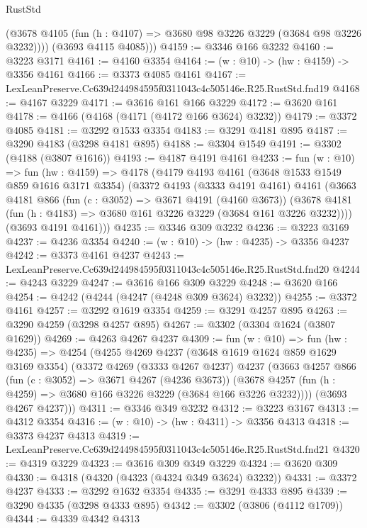\begin{lexlean}{RustStd}
\begin{coremodule}
          (@3678 @4105 (fun (h : @4107) => @3680 @98 @3226 @3229 (@3684 @98 @3226 @3232))))
        (@3693 @4115 @4085)))
@4159 := @3346 @166 @3232
@4160 := @3223 @3171
@4161 := @4160 @3354
@4164 := (w : @10) -> (hw : @4159) -> @3356 @4161
@4166 := @3373 @4085 @4161
@4167 := LexLeanPreserve.Cc639d244984595f0311043c4c505146e.R25.RustStd.fnd19
@4168 := @4167 @3229
@4171 := @3616 @161 @166 @3229
@4172 := @3620 @161
@4178 := @4166 (@4168 (@4171 (@4172 @166 @3624) @3232))
@4179 := @3372 @4085
@4181 := @3292 @1533 @3354
@4183 := @3291 @4181 @895
@4187 := @3290 @4183 (@3298 @4181 @895)
@4188 := @3304 @1549
@4191 := @3302 (@4188 (@3807 @1616))
@4193 := @4187 @4191 @4161
@4233 := fun (w : @10) =>
  fun (hw : @4159) =>
  @4178
    (@4179
      @4193
      @4161
      (@3648 @1533 @1549 @859 @1616 @3171 @3354)
      (@3372
        @4193
        (@3333 @4191 @4161)
        @4161
        (@3663
          @4181
          @866
          (fun (c : @3052) => @3671 @4191 (@4160 @3673))
          (@3678 @4181 (fun (h : @4183) => @3680 @161 @3226 @3229 (@3684 @161 @3226 @3232))))
        (@3693 @4191 @4161)))
@4235 := @3346 @309 @3232
@4236 := @3223 @3169
@4237 := @4236 @3354
@4240 := (w : @10) -> (hw : @4235) -> @3356 @4237
@4242 := @3373 @4161 @4237
@4243 := LexLeanPreserve.Cc639d244984595f0311043c4c505146e.R25.RustStd.fnd20
@4244 := @4243 @3229
@4247 := @3616 @166 @309 @3229
@4248 := @3620 @166
@4254 := @4242 (@4244 (@4247 (@4248 @309 @3624) @3232))
@4255 := @3372 @4161
@4257 := @3292 @1619 @3354
@4259 := @3291 @4257 @895
@4263 := @3290 @4259 (@3298 @4257 @895)
@4267 := @3302 (@3304 @1624 (@3807 @1629))
@4269 := @4263 @4267 @4237
@4309 := fun (w : @10) =>
  fun (hw : @4235) =>
  @4254
    (@4255
      @4269
      @4237
      (@3648 @1619 @1624 @859 @1629 @3169 @3354)
      (@3372
        @4269
        (@3333 @4267 @4237)
        @4237
        (@3663
          @4257
          @866
          (fun (c : @3052) => @3671 @4267 (@4236 @3673))
          (@3678 @4257 (fun (h : @4259) => @3680 @166 @3226 @3229 (@3684 @166 @3226 @3232))))
        (@3693 @4267 @4237)))
@4311 := @3346 @349 @3232
@4312 := @3223 @3167
@4313 := @4312 @3354
@4316 := (w : @10) -> (hw : @4311) -> @3356 @4313
@4318 := @3373 @4237 @4313
@4319 := LexLeanPreserve.Cc639d244984595f0311043c4c505146e.R25.RustStd.fnd21
@4320 := @4319 @3229
@4323 := @3616 @309 @349 @3229
@4324 := @3620 @309
@4330 := @4318 (@4320 (@4323 (@4324 @349 @3624) @3232))
@4331 := @3372 @4237
@4333 := @3292 @1632 @3354
@4335 := @3291 @4333 @895
@4339 := @3290 @4335 (@3298 @4333 @895)
@4342 := @3302 (@3806 (@4112 @1709))
@4344 := @4339 @4342 @4313

\end{coremodule}
\end{lexlean}
